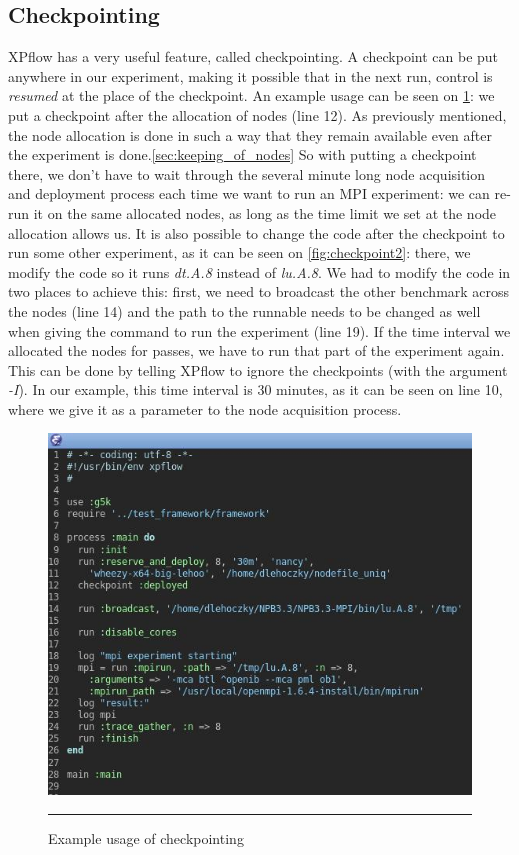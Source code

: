 \subsection{Checkpointing}
XPflow has a very useful feature, called checkpointing. A checkpoint
can be put anywhere in our experiment, making it possible that in the
next run, control is \emph{resumed} at the place of the
checkpoint. An example usage can be seen on \ref{fig:checkpoint1}: we
put a checkpoint after the allocation of nodes (line 12). As previously
mentioned, the node allocation is done in such a way that they remain
available even after the experiment is done.\ref{sec:keeping_of_nodes}
So with putting a checkpoint there, we don't have to wait through the
several minute long node acquisition and deployment process each time
we want to run an MPI experiment: we can re-run it on the same
allocated nodes, as long as the time limit we set at the node
allocation allows us. It is also possible to change the code after the
checkpoint to run some other experiment, as it can be seen on
\ref{fig:checkpoint2}: there, we modify the code so it runs
\emph{dt.A.8} instead of \emph{lu.A.8}. We had to modify the code in
two places to achieve this: first, we need to broadcast the other
benchmark across the nodes (line 14) and the path to the runnable
needs to be changed as well when giving the command to run the
experiment (line 19). If the time interval we allocated the nodes for
passes, we have to run that part of the experiment again. This can be
done by telling XPflow to ignore the checkpoints (with the argument
\emph{-I}). In our example, this time interval is 30 minutes, as it
can be seen on line 10, where we give it as a parameter to the node
acquisition process.
\begin{figure}[htbp]
  \centering
    \includegraphics[scale=0.7]{./Figures/checkpoint1.jpg}
    \rule{35em}{0.5pt}
  \caption[Checkpoint example]{Example usage of checkpointing}
  \label{fig:checkpoint1}
\end{figure}
